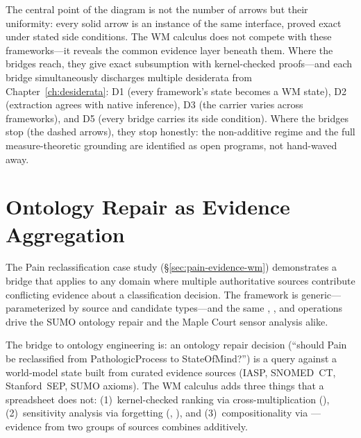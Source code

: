\documentclass[11pt,openany]{report}
\begin{document}
\noindent
The central point of the diagram is not the number of arrows
but their uniformity: every solid arrow is an instance of the
same  interface, proved exact under stated side
conditions.  The WM calculus does not compete with these
frameworks---it reveals the common evidence layer beneath them.
Where the bridges reach, they give exact subsumption with
kernel-checked proofs---and each bridge simultaneously
discharges multiple desiderata from
Chapter~\ref{ch:desiderata}: D1 (every framework's state
becomes a WM state), D2 (extraction agrees with native
inference), D3 (the carrier varies across frameworks), and D5
(every bridge carries its side condition).
Where the bridges stop (the dashed arrows),
they stop honestly: the non-additive regime and the full
measure-theoretic grounding are identified as open programs,
not hand-waved away.


\section{Ontology Repair as Evidence Aggregation}

The Pain reclassification case study
(\S\ref{sec:pain-evidence-wm}) demonstrates a bridge that applies
to any domain where multiple authoritative sources contribute
conflicting evidence about a classification decision.  The
 framework is generic---parameterized by
source and candidate types---and the same ,
, and  operations drive the
SUMO ontology repair and the Maple Court sensor analysis alike.

The bridge to ontology engineering is: an ontology repair decision
(``should Pain be reclassified from PathologicProcess to
StateOfMind?'') is a query against a world-model state built from
curated evidence sources (IASP, SNOMED~CT, Stanford~SEP, SUMO
axioms).  The WM calculus adds three things that a spreadsheet
does not: (1)~kernel-checked ranking via cross-multiplication
(), (2)~sensitivity analysis
via forgetting (,
), and (3)~compositionality
via ---evidence from two groups of sources
combines additively.

\end{document}
